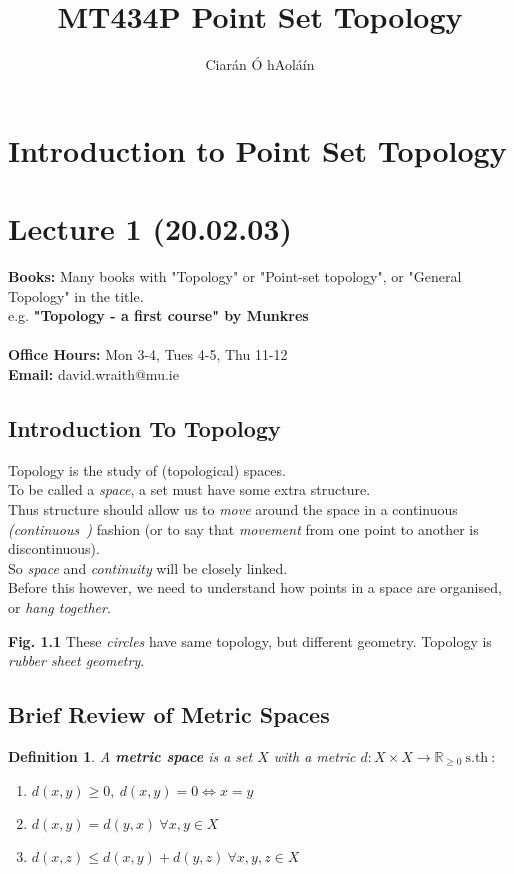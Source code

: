 \documentclass{article}
\title{MT434P Point Set Topology}
\author{Ciarán Ó hAoláín}
\newcommand{\sth}{\mathrm{s.th}\ }
\newcommand{\R}{\mathbb{R}}
\newcommand{\cts}{continuous\ }
\newtheorem{definition}[theorem]{Definition}
\theoremstyle{remark}
\theoremstyle{example}
\theoremstyle{examples}
\begin{document}
	\maketitle
	
	\section{Introduction to Point Set Topology}
	\section*{Lecture 1 (20.02.03)}
	\textbf{Books: }Many books with "Topology" or "Point-set topology", or "General Topology" in the title.\\
	e.g. \textbf{"Topology - a first course" by Munkres}\\
	\\
	\textbf{Office Hours:} Mon 3-4, Tues 4-5, Thu 11-12\\
	\textbf{Email:} david.wraith@mu.ie

	\subsection*{Introduction To Topology}
	Topology is the study of (topological) spaces.\\
	To be called a \textit{space}, a set must have some extra structure.\\
	Thus structure should allow us to \textit{move} around the space in a continuous \textit{(\cts)} fashion (or to say that \textit{movement} from one point to another is discontinuous).\\
	So \textit{space} and \textit{continuity} will be closely linked.\\
	Before this however, we need to understand how points in a space are organised, or \textit{hang together}.
	
	\textbf{Fig. 1.1}
	These \textit{circles} have same topology, but different geometry. Topology is \textit{rubber sheet geometry}.
	
	\subsection{Brief Review of Metric Spaces}
	\begin{definition}
		A \textbf{metric space} is a set $X$ with a \textit{metric} $d: X \times X \to \R_{\geq 0}\ \sth:$
		\begin{enumerate}
			\item $d(x,y) \geq 0,\ d(x,y)=0 \iff x=y$
			\item $d(x,y) = d(y,x)\ \forall x,y \in X$
			\item $d(x,z) \leq d(x,y) + d(y,z)\ \forall x,y,z \in X$
		\end{enumerate}
	\end{definition}
\end{document}
